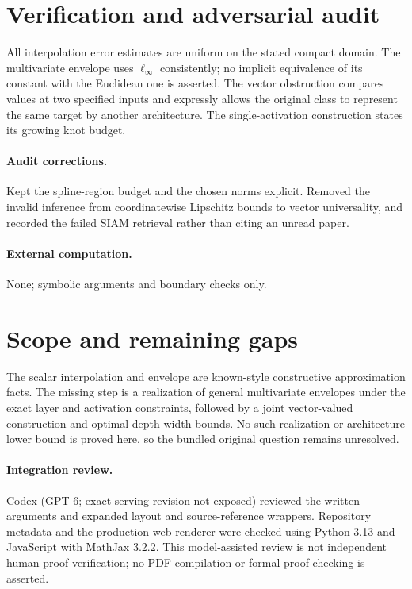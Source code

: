 \documentclass[11pt]{article}
\begin{document}
\section{Verification and adversarial audit}

All interpolation error estimates are uniform on the stated compact domain.
The multivariate envelope uses $\ell_\infty$ consistently; no implicit equivalence
of its constant with the Euclidean one is asserted. The vector obstruction
compares values at two specified inputs and expressly allows the original class
to represent the same target by another architecture. The single-activation
construction states its growing knot budget.

\paragraph{Audit corrections.} Kept the spline-region budget and the chosen norms explicit. Removed the
invalid inference from coordinatewise Lipschitz bounds to vector universality,
and recorded the failed SIAM retrieval rather than citing an unread paper.
\paragraph{External computation.} None; symbolic arguments and boundary checks only.
\section{Scope and remaining gaps}

The scalar interpolation and envelope are known-style constructive approximation
facts. The missing step is a realization of general multivariate envelopes under
the exact layer and activation constraints, followed by a joint vector-valued
construction and optimal depth-width bounds. No such realization or architecture
lower bound is proved here, so the bundled original question remains unresolved.

\paragraph{Integration review.} Codex (GPT-6; exact serving revision not exposed) reviewed the written arguments and expanded layout and source-reference wrappers. Repository metadata and the production web renderer were checked using Python 3.13 and JavaScript with MathJax 3.2.2. This model-assisted review is not independent human proof verification; no PDF compilation or formal proof checking is asserted.
\end{document}
